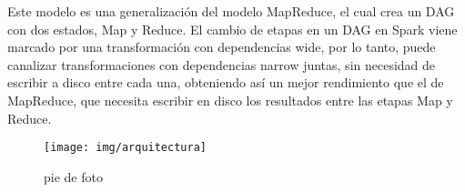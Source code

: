 Este modelo es una generalización del modelo MapReduce, el cual crea un DAG con dos estados, Map y Reduce. El cambio de etapas en un DAG en Spark viene marcado por una transformación con dependencias wide, por lo tanto, puede canalizar transformaciones con dependencias narrow juntas, sin necesidad de escribir a disco entre cada una, obteniendo así un mejor rendimiento que el de MapReduce, que necesita escribir en disco los resultados entre las etapas Map y Reduce.\\

\begin{figure}[H]
	\texttt{[image: img/arquitectura]}
	\centering
	\caption{pie de foto}
	\label{foto}
\end{figure}
